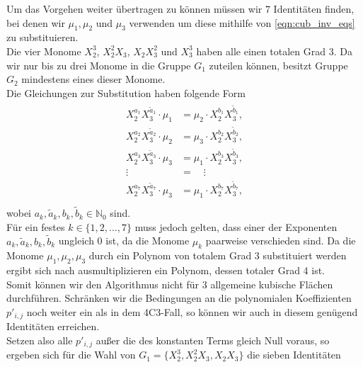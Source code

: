 \documentclass[a4paper,oneside, 11pt, openany%
]{article}
\newcommand{\N}{{\mathbb N}}
\theoremstyle{custom}
\theoremstyle{custom}
\begin{document}
	
	Um das Vorgehen weiter übertragen zu können müssen wir 7 Identitäten finden, bei denen wir $\mu_1, \mu_2$ und $\mu_3$ verwenden um diese mithilfe von \eqref{eqn:cub_inv_eqs} zu substituieren.\\
	Die vier Monome $X_{2}^{3}$, $X_{2}^{2}X_{3}$, $X_{2}X_{3}^{2}$ und $X_{3}^{3}$ haben alle einen totalen Grad $3$.
	Da wir nur bis zu drei Monome in die Gruppe $G_1$ zuteilen können, besitzt Gruppe $G_2$ mindestens eines dieser Monome.\\
	Die Gleichungen zur Substitution haben folgende Form
	\begin{gather*}
		\begin{alignedat}{1}
			X_{2}^{a_1}X_{3}^{\tilde{a}_1} \cdot \mu_1	&= \mu_2 \cdot X_{2}^{b_1}X_{3}^{\tilde{b}_1}, \\
			X_{2}^{a_2}X_{3}^{\tilde{a}_2} \cdot \mu_2	&= \mu_3 \cdot X_{2}^{b_2}X_{3}^{\tilde{b}_2},\\
			X_{2}^{a_3}X_{3}^{\tilde{a}_3} \cdot \mu_3	&= \mu_1 \cdot X_{2}^{b_3}X_{3}^{\tilde{b}_3},\\
			\vdots \quad &= \quad \vdots\\
			X_{2}^{a_7}X_{3}^{\tilde{a}_7} \cdot \mu_3	&= \mu_1 \cdot X_{2}^{b_7}X_{3}^{\tilde{b}_7},\\
		\end{alignedat}
	\end{gather*}
wobei $a_k, \tilde{a}_k ,b_k , \tilde{b}_k \in \N_{0}$ sind.\\
	
	Für ein festes $k \in \{1,2,\ldots,7\}$ muss jedoch gelten, dass einer der Exponenten  $a_k, \tilde{a}_k ,b_k , \tilde{b}_k$ ungleich 0 ist, da die Monome $\mu_k$ paarweise verschieden sind.
	Da die Monome $\mu_1,\mu_2, \mu_3$ durch ein Polynom von totalem Grad 3 substituiert werden ergibt sich nach ausmultiplizieren ein Polynom, dessen totaler Grad 4 ist.\\
	Somit können wir den Algorithmus nicht für 3 allgemeine kubische Flächen durchführen.
	Schränken wir die Bedingungen an die polynomialen Koeffizienten $p'_{i,j}$ noch weiter ein als in dem 4C3-Fall, so können wir auch in diesem genügend Identitäten erreichen.\\
	Setzen also alle $p'_{i,j}$ außer die des konstanten Terms gleich Null voraus, so ergeben sich für die Wahl von $G_1 = \{X_{2}^3,X_{2}^2X_{3},X_{2}X_{3}\}$ die sieben Identitäten
	
\end{document}
